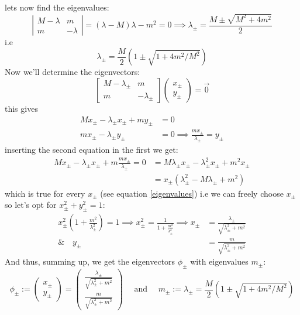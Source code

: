 \documentclass[11pt,a4paper,faculty=we,language=en,doctype=report]{cls/ugent-doc}
\begin{document}
lets now find the eigenvalues:
\begin{equation}
	\left| \begin{array}{cc}
		M-\lambda & m \\
		m & -\lambda
	\end{array} \right| = (\lambda-M)\lambda - m^2 = 0 \implies \lambda_\pm  = \frac{M\pm \sqrt{M^2 + 4m^2}}{2} \label{eigenvalues}
\end{equation}
i.e
\begin{equation}
	\lambda_\pm = \frac{M}{2}\left( 1 \pm \sqrt{1 + 4m^2/M^2}\right)
\end{equation}
Now we'll determine the eigenvectors:
\begin{equation}
\left[\begin{array}{cc}
	M-\lambda_\pm & m \\
	m & -\lambda_\pm
\end{array}\right] \left(\begin{array}{c}
x_\pm \\
y_\pm
\end{array}\right) = \vec{0}
\end{equation}
this gives
\begin{align}
	Mx_\pm - \lambda_\pm x_\pm + my_\pm &= 0\\
	m x_\pm - \lambda_\pm y_\pm &= 0 \implies \frac{m x_\pm}{\lambda_\pm} = y_\pm
\end{align}
inserting the second equation in the first we get:
\begin{align}
	Mx_\pm - \lambda_\pm x_\pm + m \frac{m x_\pm}{\lambda_\pm} = 0 &= M\lambda_\pm x_\pm - \lambda_\pm^2 x_\pm + m^2 x_\pm\\
	&= x_\pm(\lambda_\pm^2 -M\lambda_\pm + m^2)
\end{align}
which is true for every $x_\pm$ (see equation \ref{eigenvalues}) i.e we can freely choose $x_\pm$ so let's opt for $x_\pm^2 + y_\pm^2 = 1$:
\begin{align}
	x_\pm^2(1+\frac{m^2}{\lambda_\pm^2}) = 1 \implies x^2_\pm = \frac{1}{1+\frac{m^2}{\lambda_\pm^2}} \implies x_\pm &= \frac{\lambda_\pm}{\sqrt{\lambda_\pm^2 + m^2}}\\
	\& \quad y_\pm &= \frac{m}{\sqrt{\lambda_\pm^2 + m^2}}
\end{align}
And thus, summing up, we get the eigenvectors $\phi_\pm$ with eigenvalues $m_\pm$:
\begin{equation}
	\phi_\pm := \left(\begin{array}{c}
		x_\pm\\
		y_\pm
	\end{array}\right) = \left(\begin{array}{c}
		\frac{\lambda_\pm}{\sqrt{\lambda_\pm^2 + m^2}}\\
		\frac{m}{\sqrt{\lambda_\pm^2 + m^2}}
	\end{array}\right) \quad \text{ and }\quad m_\pm := \lambda_\pm =  \frac{M}{2}\left( 1 \pm \sqrt{1 + 4m^2/M^2}\right)
\end{equation}
\end{document}
